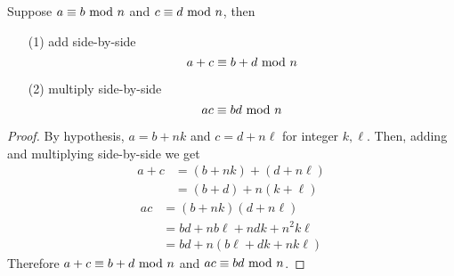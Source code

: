 \begin{proposition}\label{prop:congruencearith}
Suppose $a \equiv b \text{ mod }{n}$ and $c \equiv d \text{ mod }{n}$, then
\begin{itemize}
\item[(1)] add side-by-side
\[a + c \equiv b + d \text{ mod }{n}\]
\item[(2)] multiply side-by-side
\[ac \equiv bd \text{ mod }{n}\]
\end{itemize}
\end{proposition}
\begin{proof}
By hypothesis, $a = b + nk$ and $c = d + n\ell$ for integer $k,\ell$. Then, adding and multiplying side-by-side we get
\begin{align*}
a + c &= (b + nk) + (d + n\ell)\\[0.5em]
 &= (b + d) + n(k + \ell)
\end{align*}
\begin{align*}
ac &= (b + nk)(d + n\ell)\\[0.5em]
 &= bd + nb\ell + ndk + n^2k\ell\\[0.5em]
 &= bd + n(b\ell + dk + nk\ell)
\end{align*}
Therefore $a+c \equiv b+d \text{ mod }{n}$ and $ac \equiv bd \text{ mod }{n}$.
\end{proof}


